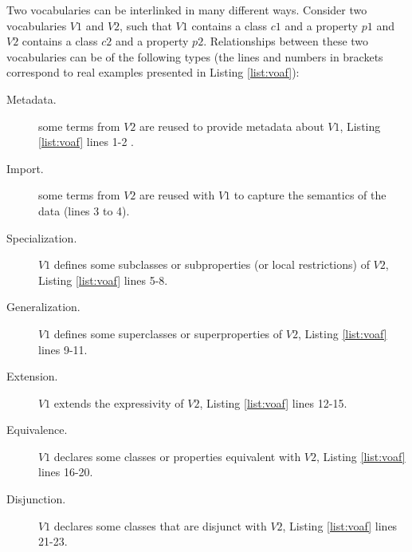 \documentclass{iosart2c}
\begin{document}
Two vocabularies can be interlinked in many different ways. Consider two vocabularies $V1$ and $V2$, such that $V1$ contains a class $c1$ and a property $p1$ and $V2$ contains a class $c2$ and a property $p2$. Relationships between these two vocabularies can be of the following types (the lines and numbers in brackets correspond to real examples presented in Listing \ref{list:voaf}):

		\begin{description}
			\item [Metadata.] some terms from $V2$ are reused to provide metadata about $V1$, Listing \ref{list:voaf} lines 1-2 .

			\item [Import.] some terms from $V2$ are reused with $V1$ to capture the semantics of the data (lines 3 to 4).

			\item [Specialization.] $V1$ defines some subclasses or subproperties (or local restrictions) of $V2$, Listing \ref{list:voaf} lines 5-8.

			\item [Generalization.] $V1$ defines some superclasses or superproperties of $V2$, Listing \ref{list:voaf} lines 9-11.

			\item [Extension.] $V1$ extends the expressivity of $V2$, Listing \ref{list:voaf} lines 12-15.

			\item [Equivalence.] $V1$ declares some  classes or properties equivalent with $V2$, Listing \ref{list:voaf} lines 16-20.

			\item [Disjunction.] $V1$ declares some classes that are disjunct  with $V2$, Listing \ref{list:voaf} lines 21-23.
		\end{description}
\end{document}
